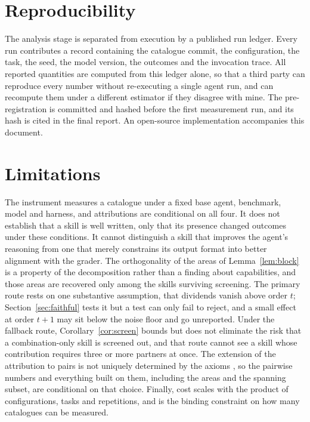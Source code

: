 \documentclass[11pt]{article}
\theoremstyle{plain}
\theoremstyle{definition}
\theoremstyle{remark}
\begin{document}
\section{Reproducibility}

The analysis stage is separated from execution by a published run ledger. Every run contributes a record containing the catalogue commit, the configuration, the task, the seed, the model version, the outcomes and the invocation trace. All reported quantities are computed from this ledger alone, so that a third party can reproduce every number without re-executing a single agent run, and can recompute them under a different estimator if they disagree with mine. The pre-registration is committed and hashed before the first measurement run, and its hash is cited in the final report. An open-source implementation accompanies this document.

\section{Limitations}

The instrument measures a catalogue under a fixed base agent, benchmark, model and harness, and attributions are conditional on all four. It does not establish that a skill is well written, only that its presence changed outcomes under these conditions. It cannot distinguish a skill that improves the agent's reasoning from one that merely constrains its output format into better alignment with the grader. The orthogonality of the areas of Lemma~\ref{lem:block} is a property of the decomposition rather than a finding about capabilities, and those areas are recovered only among the skills surviving screening. The primary route rests on one substantive assumption, that dividends vanish above order $t$; Section~\ref{sec:faithful} tests it but a test can only fail to reject, and a small effect at order $t+1$ may sit below the noise floor and go unreported. Under the fallback route, Corollary~\ref{cor:screen} bounds but does not eliminate the risk that a combination-only skill is screened out, and that route cannot see a skill whose contribution requires three or more partners at once. The extension of the attribution to pairs is not uniquely determined by the axioms \cite{faithshap}, so the pairwise numbers and everything built on them, including the areas and the spanning subset, are conditional on that choice. Finally, cost scales with the product of configurations, tasks and repetitions, and is the binding constraint on how many catalogues can be measured.
\end{document}
